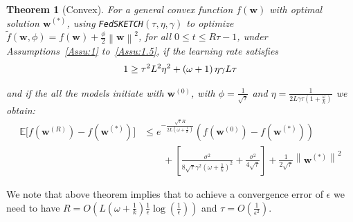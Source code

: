 \documentclass[sigconf, anonymous, review]{acmart}
\newcommand{\todo}[1]{\textcolor{red}{ToDo:~#1}}
\newtheorem{theorem}{Theorem}
\begin{document}
\begin{theorem}[Convex]\label{thm:cvx-iid}
 For a general convex function $f(\boldsymbol{w})$ with optimal solution $\boldsymbol{w}^{(*)}$, using  \texttt{FedSKETCH}$(\tau, \eta, \gamma)$ to optimize $\tilde{f}(\boldsymbol{w},\phi)=f(\mathbf{\boldsymbol{w}})+\frac{\phi}{2}\left\|\boldsymbol{w}\right\|^2$,  for all $0\leq t\leq R\tau-1$,  under Assumptions~\ref{Assu:1} to~\ref{Assu:1.5}, if the learning rate satisfies 
 \begin{align}\notag
   1\geq {\tau^2 L^2\eta^2}+\left({\omega}+1\right){\eta\gamma L}{\tau} 
\end{align}

and if the all the models initiate with $\boldsymbol{w}^{(0)}$, with $\phi=\frac{1}{\sqrt{\tau}}$ and $\eta=\frac{1}{2L\gamma\tau\left(1+\frac{\omega}{k}\right)}$ we obtain:
\begin{align}
        \mathbb{E}\Big[f({\boldsymbol{w}}^{(R)})-f({\boldsymbol{w}}^{(*)})\Big]&\leq e^{-\frac{\sqrt{\tau} R}{2L\left(\omega+\frac{1}{k}\right) }}\left(f(\boldsymbol{w}^{(0)})-f(\boldsymbol{w}^{(*)})\right)\nonumber\\
        &\qquad +\left[\frac{\sigma^2}{8\sqrt{\tau}\gamma^2\left(\omega+\frac{1}{k}\right)^2} +\frac{\sigma^2}{4\sqrt{\tau}} \right] +\frac{1}{2\sqrt{\tau}}\left\|\boldsymbol{w}^{(*)}\right\|^2\label{eq:cvx-iid}
\end{align}{{}}
\end{theorem}
We note that above theorem implies that to achieve a convergence error of $\epsilon$ we need to have $R=O\left(L\left(\omega+\frac{1}{k}\right)\frac{1}{\epsilon}\log\left(\frac{1}{\epsilon}\right)\right)$ and $\tau=O\left(\frac{1}{\epsilon^2}\right)$.
\end{document}
